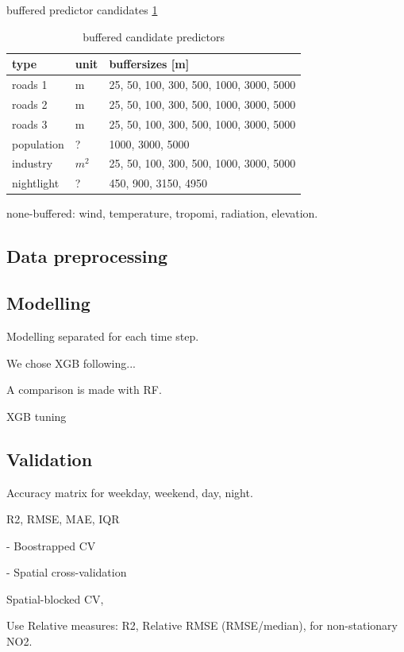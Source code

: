 \documentclass{article}
\begin{document}
buffered predictor candidates \ref{tab-buff-pred}
  
\begin{table}\centering
\caption{buffered candidate predictors}
\label{tab-buff-pred}
\begin{tabular}{@{}lll@{}}\toprule
type & unit & buffersizes [m] \\ \midrule
roads 1 & m & 25, 50, 100, 300, 500, 1000, 3000, 5000 \\
roads 2 & m& 25, 50, 100, 300, 500, 1000, 3000, 5000 \\
roads 3 & m& 25, 50, 100, 300, 500, 1000, 3000, 5000 \\
population  &? & 1000, 3000, 5000 \\
industry  & $m^2$ & 25, 50, 100, 300, 500, 1000, 3000, 5000\\
nightlight   & ?& 450, 900, 3150, 4950\\
\bottomrule
\end{tabular}
\end{table}

none-buffered: wind, temperature, tropomi, radiation, elevation.

\subsection{Data preprocessing}

\subsection{Modelling}
Modelling separated for each time step.

We chose XGB following...

A comparison is made with RF. 

XGB tuning

\subsection{Validation}

Accuracy matrix for weekday, weekend, day, night.

R2, RMSE, MAE, IQR

- Boostrapped CV

- Spatial cross-validation

Spatial-blocked CV,

Use Relative measures: 
R2, Relative RMSE (RMSE/median), for non-stationary NO2. 
\end{document}
